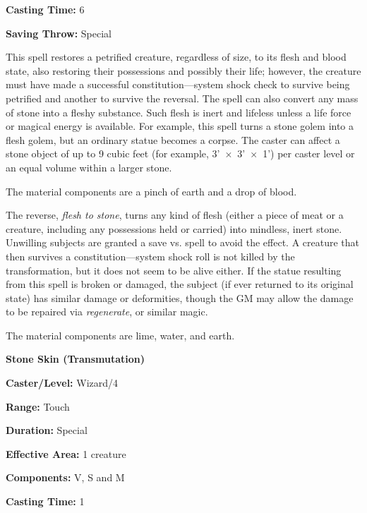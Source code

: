 \begin{multicols}{2}
\begin{minipage}{\columnwidth}
\noindent \textbf{Casting Time:} 6

\noindent \textbf{Saving Throw:} Special

\end{minipage}

This spell restores a petrified creature, regardless of size, to its flesh and blood state, also restoring their possessions and possibly their life; however, the creature must have made a successful constitution---system shock check to survive being petrified and another to survive the reversal.  The spell can also convert any mass of stone into a fleshy substance.  Such flesh is inert and lifeless unless a life force or magical energy is available.  For example, this spell turns a stone golem into a flesh golem, but an ordinary statue becomes a corpse.  The caster can affect a stone object of up to 9 cubic feet (for example, 3'~$\times$~3'~$\times$~1') per caster level or an equal volume within a larger stone. 
	
The material components are a pinch of earth and a drop of blood.

The reverse, \textit{flesh to stone}, turns any kind of flesh (either a piece of meat or a creature, including any possessions held or carried) into mindless, inert stone.  Unwilling subjects are granted a save vs. spell to avoid the effect.  A creature that then survives a constitution---system shock roll is not killed by the transformation, but it does not seem to be alive either.  If the statue resulting from this spell is broken or damaged, the subject (if ever returned to its original state) has similar damage or deformities, though the GM may allow the damage to be repaired via \textit{regenerate}, or similar magic. 

The material components are lime, water, and earth.

\vspace{1em}

\noindent
\begin{minipage}{\columnwidth}

\noindent \textbf{Stone Skin (Transmutation)}

\noindent \textbf{Caster/Level:} Wizard/4

\noindent \textbf{Range:} Touch

\noindent \textbf{Duration:} Special

\noindent \textbf{Effective Area:} 1 creature

\noindent \textbf{Components:} V, S and M

\noindent \textbf{Casting Time:} 1


\end{minipage}
\end{multicols}
